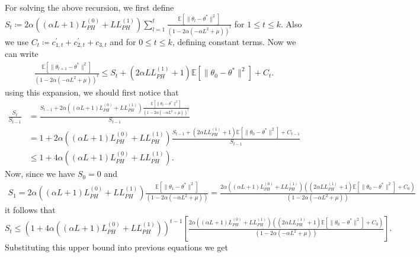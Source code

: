 \documentclass[a4paper]{article}
\newcommand{\norm}[1]{\|#1 \|}
\newcommand{\Exs}{\mathbb{E}}
\newcommand{\thetastar}{\theta^*}
\newcommand{\constLPH}[1]{L_{PH}^{(#1)}}
\newcommand{\stepsize}{\alpha}
\begin{document}
	\pagebreak
	
	For solving the above recursion, we first define $S_{t} \coloneq 2\stepsize\left(\left(\stepsize L + 1\right)\constLPH{0} + L \constLPH{1}\right)\sum_{l = 1}^{t}\frac{\Exs\left[\norm{\theta_{l} - \thetastar}^{2}\right]}{\left(1 - 2\stepsize\left(-\stepsize L^{2} + \mu\right)\right)^{l}}$ for $1 \le t \le k$. Also we use $C_{t} \coloneq c_{1, t}^{\prime} + c_{2, t}^{\prime} + c_{3, t}$ and for $0 \le t \le k$, defining constant terms. Now we can write
	\begin{align*}
		\frac{\Exs\left[\norm{\theta_{t + 1} - \thetastar}^{2}\right]}{\left(1 - 2\stepsize\left(-\stepsize L^{2} + \mu\right)\right)^{t}} \le S_{t} + \left(2\stepsize L \constLPH{1} + 1\right)\Exs\left[\norm{\theta_{0} - \thetastar}^{2}\right] +‌ C_{t}.‌
	\end{align*}
	using this expansion, we should first notice that
	\begin{align*}
		\frac{S_{t}}{S_{t - 1}} & = \frac{S_{t - 1} + 2\stepsize\left(\left(\stepsize L + 1\right)\constLPH{0} + L \constLPH{1}\right)\frac{\Exs\left[\norm{\theta_{t} - \thetastar}^{2}\right]}{\left(1 - 2\stepsize\left(-\stepsize L^{2} + \mu\right)\right)^{t}}}{S_{t - 1}} \\
		& = 1 + 2\stepsize\left(\left(\stepsize L + 1\right)\constLPH{0} + L \constLPH{1}\right)\frac{S_{t - 1} + \left(2\stepsize L \constLPH{1} + 1\right)\Exs\left[\norm{\theta_{0} - \thetastar}^{2}\right] + C_{t - 1}}{S_{t - 1}} \\
		& \leq 1 + 4\stepsize\left(\left(\stepsize L + 1\right)\constLPH{0} + L \constLPH{1}\right).
	\end{align*}
	Now, since we have $S_{0} = 0$ and
	\begin{align*}
		S_{1} = 2\stepsize\left(\left(\stepsize L + 1\right)\constLPH{0} + L \constLPH{1}\right)\frac{\Exs\left[\norm{\theta_{1} - \thetastar}^{2}\right]}{\left(1 - 2\stepsize\left(-\stepsize L^{2} + \mu\right)\right)} = \frac{2\stepsize\left(\left(\stepsize L + 1\right)\constLPH{0} + L \constLPH{1}\right)\left(\left(2\stepsize L \constLPH{1} + 1\right)\Exs\left[\norm{\theta_{0} - \thetastar}^{2}\right] + C_{0}\right)}{\left(1 - 2\stepsize\left(-\stepsize L^{2} + \mu\right)\right)}
	\end{align*}
	it follows that $S_{t} \leq \left(1 + 4\stepsize\left(\left(\stepsize L + 1\right)\constLPH{0} + L \constLPH{1}\right)\right)^{t - 1}\left[\frac{2\stepsize\left(\left(\stepsize L + 1\right)\constLPH{0} + L \constLPH{1}\right)\left(\left(2\stepsize L \constLPH{1} + 1\right)\Exs\left[\norm{\theta_{0} - \thetastar}^{2}\right] + C_{0}\right)}{\left(1 - 2\stepsize\left(-\stepsize L^{2} + \mu\right)\right)}\right].$ Substituting this upper bound into previous equations we get
\end{document}
